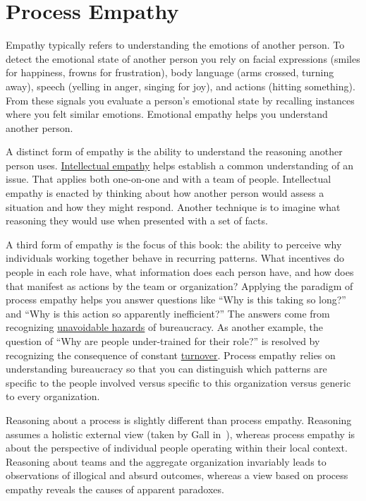 \section{Process Empathy\label{sec:process-empathy}}

Empathy typically refers to understanding the emotions of another person. To detect the emotional state of another person you rely on facial expressions (smiles for happiness, frowns for frustration), body language (arms crossed, turning away), speech (yelling in anger, singing for joy), and actions (hitting something). From these signals you evaluate a person's emotional state by recalling instances where you felt similar emotions. Emotional empathy helps you understand another person. 

A distinct form of empathy is the ability to understand the reasoning another person uses.  
\hyperref[sec:intellectual-empathy]{Intellectual empathy} helps establish a common understanding of an issue. That applies both one-on-one and with a team of people. Intellectual empathy is enacted by thinking about how another person would assess a situation and how they might respond. Another technique is to imagine what reasoning they would use when presented with a set of facts. 


A third form of empathy is the focus of this book: the ability to perceive why individuals working together behave in recurring patterns. What incentives do people in each role have, what information does each person have, and how does that manifest as actions by the team or organization? Applying the paradigm of \gls{process empathy} helps you answer questions like ``Why is this taking so long?'' and ``Why is this action so apparently inefficient?'' The answers come from recognizing \hyperref[sec:unavoidable-hazards]{unavoidable hazards} of bureaucracy. As another example, the question of ``Why are people under-trained for their role?'' is resolved by recognizing the consequence of  constant \hyperref[sec:turnover]{turnover}. Process empathy relies on understanding bureaucracy so that you can distinguish which patterns are specific to the people involved versus specific to this organization versus generic to every organization.

Reasoning about a process is slightly different than process empathy. Reasoning assumes a holistic external view (taken by Gall in~\cite{2002_Gall}), whereas process empathy is about the perspective of individual people operating within their local context. Reasoning about teams and the aggregate organization invariably leads to observations of illogical and absurd outcomes, whereas a view based on process empathy reveals the causes of apparent paradoxes.

